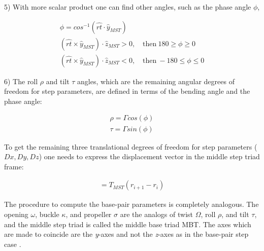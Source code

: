 
5) With more scalar product one  can find other angles, such as the phase
angle $\phi$,

\begin{gather}
\phi = cos^{-1}(\hat{rt} \cdot \hat{y}_{MST})\\
(\hat{rt} \times \hat{y}_{MST}) \cdot \hat{z}_{MST} > 0, \quad \textrm{then} \ 180 \geq \phi \geq 0\\
(\hat{rt} \times \hat{y}_{MST}) \cdot \hat{z}_{MST} < 0, \quad \textrm{then} \ -180 \leq \phi \leq 0
\end{gather}

6) The  roll $\rho$  and tilt $\tau$  angles, which are  the remaining
angular degrees of  freedom for step parameters, are  defined in terms
of the bending angle and the phase angle:

\begin{gather}
\rho = \Gamma cos (\phi)\\
\tau = \Gamma sin (\phi)
\end{gather}

To  get the remaining  three translational degrees of  freedom for
step  parameters  ($Dx,  Dy,  Dz$)  one  needs  to  express  the
displacement vector in the middle step triad frame:

\begin{gather}
[D_xD_yD_z]=T_{MST}(r_{i+1} - r_{i})
\end{gather}

The  procedure  to  compute  the base-pair  parameters  is  completely
analogous.   The  opening  $\omega$,  buckle $\kappa$,  and  propeller
$\sigma$  are the  analogs of  twist $\Omega$,  roll $\rho$,  and tilt
$\tau$, and the middle step triad is called the middle base triad MBT.
The axes  which are made to  coincide are the  \textit{y}-axes and not
the \textit{z}-axes as in the base-pair step case \cite{lu1997}.

